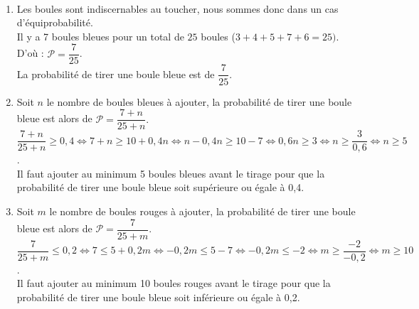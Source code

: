 \ \\ [-5mm]
   \begin{enumerate}
      \item Les boules sont indiscernables au toucher, nous sommes donc dans un cas d'équiprobabilité. \\
         Il y a 7 boules bleues pour un total de $25$ boules ($3+4+5+7+6 =25)$. D'où : $\mathcal{P} =\dfrac{7}{25}$. \\
         {\blue La probabilité de tirer une boule bleue est de $\dfrac7{25}$.}
      \item Soit $n$ le nombre de boules bleues à ajouter, la probabilité de tirer une boule bleue est alors de $\mathcal{P} =\dfrac{7+n}{25+n}.$ \\
         $\dfrac{7+n}{25+n} \geqslant 0,4 \iff
            7+n \geqslant 10+0,4n \iff
            n-0,4n \geqslant 10-7 \iff
            0,6n \geqslant 3 \iff
            n \geqslant \dfrac{3}{0,6} \iff
            n \geqslant 5$. \\ [1mm]
         {\blue Il faut ajouter au minimum 5 boules bleues} avant le tirage pour que la probabilité de tirer une boule bleue soit supérieure ou égale à 0,4.
      \item Soit $m$ le nombre de boules rouges à ajouter, la probabilité de tirer une boule bleue est alors de $\mathcal{P} =\dfrac{7}{25+m}.$  \\
         $\dfrac{7}{25+m} \leqslant 0,2 \iff
          7 \leqslant 5+0,2m \iff
          -0,2m \leqslant 5-7 \iff
          -0,2m \leqslant -2 \iff
          m \geqslant \dfrac{-2}{-0,2} \iff
          m \geqslant 10$. \\ [1mm]
         {\blue Il faut ajouter au minimum 10 boules rouges} avant le tirage pour que la probabilité de tirer une boule bleue soit inférieure ou égale à 0,2.
   \end{enumerate}
